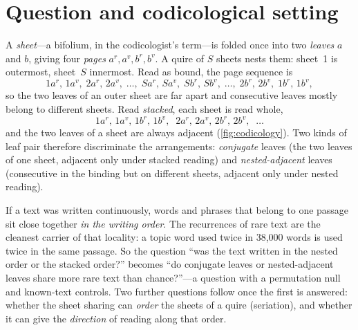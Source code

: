 \documentclass[11pt,a4paper]{article}
\begin{document}
\section{Question and codicological setting}
\label{sec:question}

A \emph{sheet}---a bifolium, in the codicologist's term---is folded once into two \emph{leaves} $a$ and $b$, giving four \emph{pages} $a^r, a^v, b^r, b^v$. A quire of $S$ sheets nests them: sheet~1 is outermost, sheet~$S$ innermost. Read as bound, the page sequence is
\begin{equation}
1a^r,\,1a^v,\;2a^r,\,2a^v,\;\dots,\;Sa^r,\,Sa^v,\;Sb^r,\,Sb^v,\;\dots,\;2b^r,\,2b^v,\;1b^r,\,1b^v ,
\label{eq:nested}
\end{equation}
so the two leaves of an outer sheet are far apart and consecutive leaves mostly belong to different sheets. Read \emph{stacked}, each sheet is read whole,
\begin{equation}
1a^r,\,1a^v,\,1b^r,\,1b^v,\;\;2a^r,\,2a^v,\,2b^r,\,2b^v,\;\;\dots
\label{eq:stacked}
\end{equation}
and the two leaves of a sheet are always adjacent (\cref{fig:codicology}). Two kinds of leaf pair therefore discriminate the arrangements: \emph{conjugate} leaves (the two leaves of one sheet, adjacent only under stacked reading) and \emph{nested-adjacent} leaves (consecutive in the binding but on different sheets, adjacent only under nested reading).

If a text was written continuously, words and phrases that belong to one passage sit close together \emph{in the writing order}. The recurrences of rare text are the cleanest carrier of that locality: a topic word used twice in 38,000 words is used twice in the same passage. So the question ``was the text written in the nested order or the stacked order?'' becomes ``do conjugate leaves or nested-adjacent leaves share more rare text than chance?''---a question with a permutation null and known-text controls. Two further questions follow once the first is answered: whether the sheet sharing can \emph{order} the sheets of a quire (seriation), and whether it can give the \emph{direction} of reading along that order.
\end{document}

